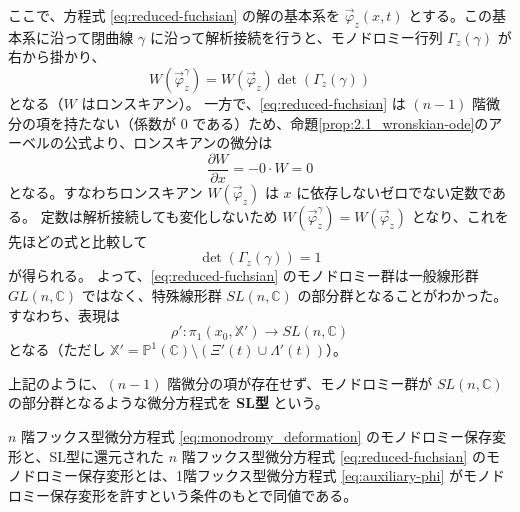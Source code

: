 ここで、方程式 \eqref{eq:reduced-fuchsian} の解の基本系を $\vec{\varphi}_z(x,t)$ とする。この基本系に沿って閉曲線 $\gamma$ に沿って解析接続を行うと、モノドロミー行列 $\Gamma_z(\gamma)$ が右から掛かり、
\[
W(\vec{\varphi}_z^{\gamma}) = W(\vec{\varphi}_z) \det(\Gamma_z(\gamma))
\]
となる（$W$ はロンスキアン）。
一方で、\eqref{eq:reduced-fuchsian} は $(n-1)$ 階微分の項を持たない（係数が $0$ である）ため、命題\ref{prop:2.1_wronskian-ode}のアーベルの公式より、ロンスキアンの微分は
\[
\frac{\partial W}{\partial x} = -0 \cdot W = 0
\]
となる。すなわちロンスキアン $W(\vec{\varphi}_z)$ は $x$ に依存しないゼロでない定数である。
定数は解析接続しても変化しないため $W(\vec{\varphi}_z^{\gamma}) = W(\vec{\varphi}_z)$ となり、これを先ほどの式と比較して
\[
\det(\Gamma_z(\gamma)) = 1
\]
が得られる。
よって、\eqref{eq:reduced-fuchsian} のモノドロミー群は一般線形群 $GL(n, \mathbb{C})$ ではなく、特殊線形群 $SL(n, \mathbb{C})$ の部分群となることがわかった。すなわち、表現は
\[
\rho' : \pi_1(x_{0}, \mathbb{X}') \to SL(n, \mathbb{C})
\]
となる（ただし $\mathbb{X}' = \mathbb{P}^{1}(\mathbb{C}) \setminus (\Xi'(t) \cup \Lambda'(t))$）。

\begin{definition}[SL型の微分方程式]
    上記のように、$(n-1)$ 階微分の項が存在せず、モノドロミー群が $SL(n, \mathbb{C})$ の部分群となるような微分方程式を \textbf{SL型} という。
\end{definition}

\begin{proposition}\label{prop:equivalence_n_ode}
    $n$ 階フックス型微分方程式 \eqref{eq:monodromy_deformation} のモノドロミー保存変形と、SL型に還元された $n$ 階フックス型微分方程式 \eqref{eq:reduced-fuchsian} のモノドロミー保存変形とは、1階フックス型微分方程式 \eqref{eq:auxiliary-phi} がモノドロミー保存変形を許すという条件のもとで同値である。
\end{proposition}

